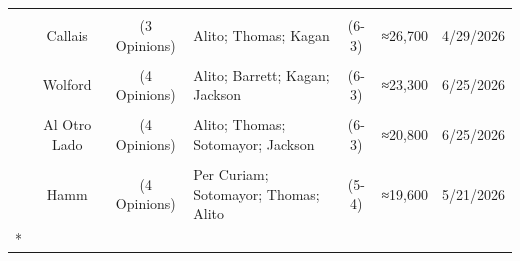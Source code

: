\documentclass[
  12pt,
]{article}
\begin{document}
\begin{longtable}[t]{>{}ccc>{\centering\arraybackslash}p{6cm}ccc}
\cellcolor{white}{\textbf{\cellcolor{gray!10}{}}} & \cellcolor{gray!10}{Slaughter} & \cellcolor{gray!10}{(3 Opinions)} & \cellcolor{gray!10}{Roberts; Gorsuch; Sotomayor} & \cellcolor{gray!10}{(6-3)} & \cellcolor{gray!10}{≈32,600} & \cellcolor{gray!10}{6/29/2026}\\
\cellcolor{white}{\textbf{}} & Callais & (3 Opinions) & Alito; Thomas; Kagan & (6-3) & ≈26,700 & 4/29/2026\\
\cellcolor{white}{\textbf{\cellcolor{gray!10}{Longest}}} & \cellcolor{gray!10}{Cook} & \cellcolor{gray!10}{(6 Opinions)} & \cellcolor{gray!10}{Roberts; Kavanaugh; Jackson; Thomas; Alito; Barrett} & \cellcolor{gray!10}{(5-4)} & \cellcolor{gray!10}{≈24,600} & \cellcolor{gray!10}{6/29/2026}\\
\cellcolor{white}{\textbf{(Total Combined)}} & Wolford & (4 Opinions) & Alito; Barrett; Kagan; Jackson & (6-3) & ≈23,300 & 6/25/2026\\
\cellcolor{white}{\textbf{\cellcolor{gray!10}{}}} & \cellcolor{gray!10}{B.P.J.} & \cellcolor{gray!10}{(5 Opinions)} & \cellcolor{gray!10}{Kavanaugh; Thomas; Gorsuch; Sotomayor; Jackson} & \cellcolor{gray!10}{(6-3)} & \cellcolor{gray!10}{≈21,900} & \cellcolor{gray!10}{6/30/2026}\\
\cellcolor{white}{\textbf{}} & Al Otro Lado & (4 Opinions) & Alito; Thomas; Sotomayor; Jackson & (6-3) & ≈20,800 & 6/25/2026\\
\cellcolor{white}{\textbf{\cellcolor{gray!10}{}}} & \cellcolor{gray!10}{Chatrie} & \cellcolor{gray!10}{(5 Opinions)} & \cellcolor{gray!10}{Kagan; Jackson; Gorsuch; Alito; Barrett} & \cellcolor{gray!10}{(6-3)} & \cellcolor{gray!10}{≈20,500} & \cellcolor{gray!10}{6/29/2026}\\
\cellcolor{white}{\textbf{}} & Hamm & (4 Opinions) & Per Curiam; Sotomayor; Thomas; Alito & (5-4) & ≈19,600 & 5/21/2026\\*
\end{longtable}
\endgroup{}
\end{document}
